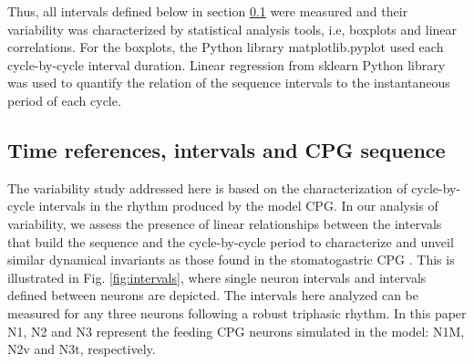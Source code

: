 Thus, all intervals defined below in section \ref{subsec:intervals} were measured and their variability was characterized by statistical analysis tools, i.e,  boxplots and linear correlations. For the boxplots, the Python library matplotlib.pyplot used each cycle-by-cycle interval duration. Linear regression from sklearn Python library was used to quantify the relation of the sequence intervals to the instantaneous period of each cycle. 

\subsection{Time references, intervals and CPG sequence}
\label{subsec:intervals}
The variability study addressed here is based on the characterization of  cycle-by-cycle intervals in the rhythm produced by the model CPG. %
In our analysis of variability, we assess the presence of linear relationships between the intervals that build the sequence and the cycle-by-cycle period to characterize and unveil similar dynamical invariants as those found in the stomatogastric CPG \cite{Elices2019}. 
This is illustrated in Fig. \ref{fig:intervals}, where single neuron intervals and intervals defined between neurons are depicted. 
The intervals here analyzed can be measured for any three neurons following a robust triphasic rhythm. In this paper N1, N2 and N3 represent the feeding CPG neurons simulated in the model: N1M, N2v and N3t, respectively.

